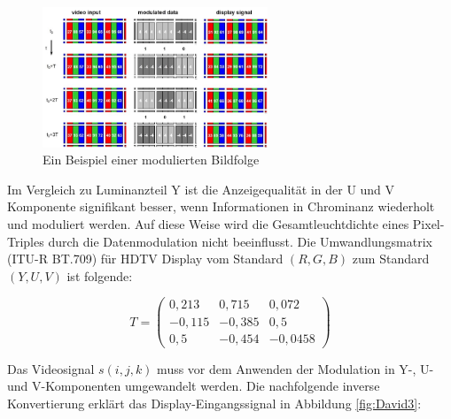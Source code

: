 \begin{figure}[htb]
	\centering 
	\includegraphics[keepaspectratio,width=0.6\textwidth]{images/2_DaViD/David4.jpg}
	\caption{Ein Beispiel einer modulierten Bildfolge}
	\label{fig:David4}
\end{figure}

Im Vergleich zu Luminanzteil Y ist die Anzeigequalität in der U und V Komponente signifikant besser, wenn Informationen in Chrominanz wiederholt und moduliert werden. Auf diese Weise wird die Gesamtleuchtdichte eines Pixel-Triples durch die Datenmodulation nicht beeinflusst. Die Umwandlungsmatrix (ITU-R BT.709) für \gls{HDTV} Display vom Standard $(R,G,B)$ zum Standard $(Y,U,V)$ ist folgende:

\begin{equation}
   T = \begin{pmatrix}
   0,213 & 0,715 & 0,072 \\
   -0,115& -0,385& 0,5	\\
   0,5   & -0,454& -0,0458
\end{pmatrix}  
\end{equation}

Das Videosignal $s(i,j,k)$ muss vor dem Anwenden der Modulation in Y-, U- und V-Komponenten umgewandelt werden. Die nachfolgende inverse Konvertierung erklärt das Display-Eingangssignal in Abbildung \ref{fig:David3}:

